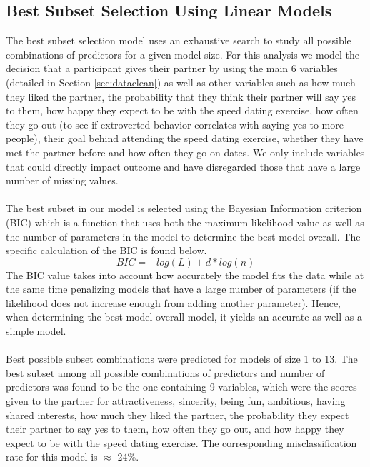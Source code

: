 \documentclass{article}
\begin{document}
\subsection{Best Subset Selection Using Linear Models}
\label{sec:bestsubsetsection}
The best subset selection model uses an exhaustive search to study all possible combinations of predictors for a given model size.  For this analysis we model the decision that a participant gives their partner by using the main 6 variables (detailed in Section \ref{sec:dataclean}) as well as other variables such as how much they liked the partner, the probability that they think their partner will say yes to them, how happy they expect to be with the speed dating exercise, how often they go out (to see if extroverted behavior correlates with saying yes to more people), their goal behind attending the speed dating exercise, whether they have met the partner before and how often they go on dates. We only include variables that could directly impact outcome and have disregarded those that have a large number of missing values. \\
\null\\
The best subset in our model is selected using the Bayesian Information criterion (BIC) which is a function that uses both the maximum likelihood value as well as the number of parameters in the model to determine the best model overall.  The specific calculation of the BIC is found below.
\begin{equation}
BIC=-log(L)+d*log(n)
\label{eq:BIC}
\end{equation}
The BIC value takes into account how accurately the model fits the data while at the same time penalizing models that have a large number of parameters (if the likelihood does not increase enough from adding another parameter). Hence, when determining the best model overall model, it yields an accurate as well as a simple model.\\
\null\\
Best possible subset combinations were predicted for models of size 1 to 13. The best subset among all possible combinations of predictors and number of predictors was found to be the one containing 9 variables, which were the scores given to the partner for attractiveness, sincerity, being fun, ambitious, having shared interests, how much they liked the partner, the probability they expect their partner to say yes to them, how often they go out, and how happy they expect to be with the speed dating exercise.  The corresponding misclassification rate for this model is $\approx$ 24\%.\\
\end{document}
